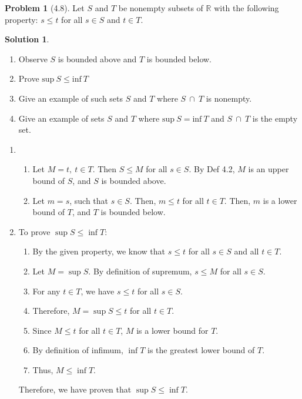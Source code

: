 \documentclass[12pt]{article}
\theoremstyle{definition} %
\newtheorem{solution}{Solution}
\newtheorem{problem}{Problem}
\theoremstyle{plain} %
\begin{document}
\begin{problem}[4.8]
 Let $S$ and $T$ be nonempty subsets of $\mathbb{R}$ with the following property:
$s\leq t$ for all $s \in S$ and $t \in T$.

   
\end{problem}
\begin{solution}
    \begin{enumerate}
        \item Observe $S$ is bounded above and $T$ is bounded below.
        \item Prove $\text{sup}\ S \leq \text{inf}\ T$
        \item Give an example of such sets $S$ and $T$ where $S \ \cap \ T$ is nonempty.
        \item Give an example of sets $S$ and $T$ where $\text{sup}\ S = \text{inf}\ T$ and $S \ \cap \ T$ is the empty set.
    \end{enumerate}
    
    \begin{enumerate}
        \item 
        \begin{enumerate}
            \item Let $M=t,\ t \in T$. Then $S\leq M$ for all $s\in S$. By Def 4.2, $M$ is an upper bound of $S$, and $S$ is bounded above.
            \item Let $m=s$, such that $s\in S$. Then, $m\leq t$ for all $t \in T$. Then, $m$ is a lower bound of $T$, and $T$ is bounded below.
        \end{enumerate}
        
        \item To prove $\sup S \leq \inf T$:
        \begin{enumerate}
            \item By the given property, we know that $s \leq t$ for all $s \in S$ and all $t \in T$.
            \item Let $M = \sup S$. By definition of supremum, $s \leq M$ for all $s \in S$.
            \item For any $t \in T$, we have $s \leq t$ for all $s \in S$.
            \item Therefore, $M = \sup S \leq t$ for all $t \in T$.
            \item Since $M \leq t$ for all $t \in T$, $M$ is a lower bound for $T$.
            \item By definition of infimum, $\inf T$ is the greatest lower bound of $T$.
            \item Thus, $M \leq \inf T$.
        \end{enumerate}
        Therefore, we have proven that $\sup S \leq \inf T$. 
    

\end{enumerate}
\end{solution}
\end{document}
